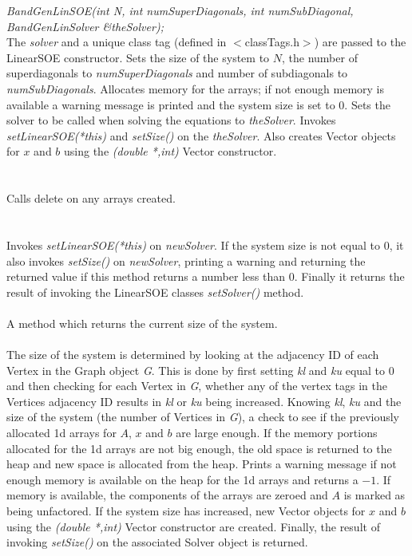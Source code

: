 {\em BandGenLinSOE(int N, int numSuperDiagonals, int numSubDiagonal,
		  BandGenLinSolver \&theSolver);        }\\
The {\em solver} and a unique class tag (defined in $<$classTags.h$>$)
are passed to the LinearSOE constructor. 
Sets the size of the system to $N$, the number of superdiagonals to 
{\em numSuperDiagonals} and number of subdiagonals to {\em
numSubDiagonals}. Allocates memory for the arrays; if not enough
memory is available a warning message is printed and the system size
is set to $0$. Sets the solver to be called when solving the
equations to {\em theSolver}. Invokes {\em setLinearSOE(*this)} and
{\em setSize()} on the {\em theSolver}. Also creates Vector objects
for $x$ and $b$ using the {\em (double *,int)} Vector constructor. \\


 \\
\\ 
Calls delete on any arrays created. \\

  \\
\\
Invokes {\em setLinearSOE(*this)} on {\em newSolver}.
If the system size is not equal to $0$, it also invokes {\em setSize()}
on {\em newSolver}, printing a warning and returning the returned value if this
method returns a number less than $0$. Finally it returns the result
of invoking the LinearSOE classes {\em setSolver()} method. \\

 \\
A method which returns the current size of the system. \\

 \\ 
The size of the system is determined by looking at the adjacency ID of
each Vertex in the Graph object {\em G}. This is done by first setting
{\em kl} and {\em ku} equal to $0$ and then checking for each Vertex
in {\em G}, whether any of the vertex tags in the Vertices adjacency
ID results in {\em kl} or {\em ku} being increased. Knowing {\em kl},
{\em ku} and the size of the system (the number of Vertices in {\em G}),
a check to see if the previously allocated 1d arrays for $A$, $x$ and
$b$ are large enough. If the memory portions allocated for the 1d
arrays are not big enough, the old space is returned to the heap and
new space is allocated from the heap. Prints a warning message if
not enough memory is available on the heap for the 1d arrays and
returns a $-1$. If memory is available, the components of the arrays
are zeroed and $A$ is marked as being unfactored. If the system size
has increased, new Vector objects for $x$ and $b$ using the {\em (double
*,int)} Vector constructor are created. Finally, the result of
invoking {\em setSize()} on the associated Solver object is returned. \\


